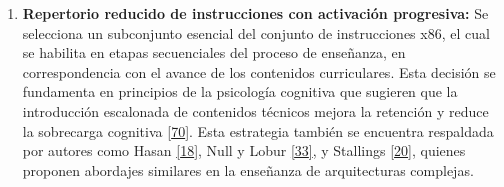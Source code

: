 \documentclass[12pt,oneside]{templates/unerthesis}
\begin{document}
\begin{enumerate}
\def\labelenumi{\arabic{enumi}.}
\setcounter{enumi}{2}
\item
  \textbf{Repertorio reducido de instrucciones con activación progresiva:}
  Se selecciona un subconjunto esencial del conjunto de instrucciones x86, el cual se habilita en etapas secuenciales del proceso de enseñanza, en correspondencia con el avance de los contenidos curriculares. Esta decisión se fundamenta en principios de la psicología cognitiva que sugieren que la introducción escalonada de contenidos técnicos mejora la retención y reduce la sobrecarga cognitiva \protect\hyperlink{ref-nationalacademies2018how}{{[}70{]}}. Esta estrategia también se encuentra respaldada por autores como Hasan \protect\hyperlink{ref-hasan_survey_2012}{{[}18{]}}, Null y Lobur \protect\hyperlink{ref-null_essentials_2023}{{[}33{]}}, y Stallings \protect\hyperlink{ref-stallings_computer_2021}{{[}20{]}}, quienes proponen abordajes similares en la enseñanza de arquitecturas complejas.

  \begin{table}[!h]
   \centering
   \caption{\label{tab:activacionprogresiva}Activación progresiva del repertorio de instrucciones}
   \centering
   \end{table}


\end{enumerate}
\end{document}

